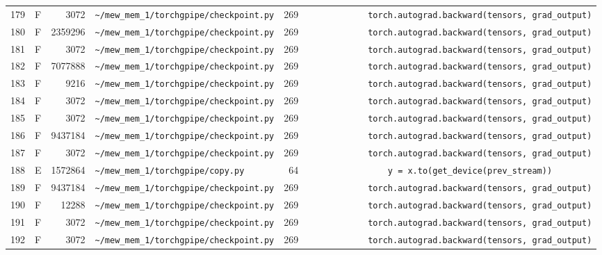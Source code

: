 \documentclass{article}
\begin{document}
\begin{longtable}{r l r p{6.5cm} r p{7.0cm}}
179 & F & 3072 & \lstinline|~/mew_mem_1/torchgpipe/checkpoint.py| & 269 & \lstinline|            torch.autograd.backward(tensors, grad_output)| \\
180 & F & 2359296 & \lstinline|~/mew_mem_1/torchgpipe/checkpoint.py| & 269 & \lstinline|            torch.autograd.backward(tensors, grad_output)| \\
181 & F & 3072 & \lstinline|~/mew_mem_1/torchgpipe/checkpoint.py| & 269 & \lstinline|            torch.autograd.backward(tensors, grad_output)| \\
182 & F & 7077888 & \lstinline|~/mew_mem_1/torchgpipe/checkpoint.py| & 269 & \lstinline|            torch.autograd.backward(tensors, grad_output)| \\
183 & F & 9216 & \lstinline|~/mew_mem_1/torchgpipe/checkpoint.py| & 269 & \lstinline|            torch.autograd.backward(tensors, grad_output)| \\
184 & F & 3072 & \lstinline|~/mew_mem_1/torchgpipe/checkpoint.py| & 269 & \lstinline|            torch.autograd.backward(tensors, grad_output)| \\
185 & F & 3072 & \lstinline|~/mew_mem_1/torchgpipe/checkpoint.py| & 269 & \lstinline|            torch.autograd.backward(tensors, grad_output)| \\
186 & F & 9437184 & \lstinline|~/mew_mem_1/torchgpipe/checkpoint.py| & 269 & \lstinline|            torch.autograd.backward(tensors, grad_output)| \\
187 & F & 3072 & \lstinline|~/mew_mem_1/torchgpipe/checkpoint.py| & 269 & \lstinline|            torch.autograd.backward(tensors, grad_output)| \\
188 & E & 1572864 & \lstinline|~/mew_mem_1/torchgpipe/copy.py| & 64 & \lstinline|                y = x.to(get_device(prev_stream))| \\
189 & F & 9437184 & \lstinline|~/mew_mem_1/torchgpipe/checkpoint.py| & 269 & \lstinline|            torch.autograd.backward(tensors, grad_output)| \\
190 & F & 12288 & \lstinline|~/mew_mem_1/torchgpipe/checkpoint.py| & 269 & \lstinline|            torch.autograd.backward(tensors, grad_output)| \\
191 & F & 3072 & \lstinline|~/mew_mem_1/torchgpipe/checkpoint.py| & 269 & \lstinline|            torch.autograd.backward(tensors, grad_output)| \\
192 & F & 3072 & \lstinline|~/mew_mem_1/torchgpipe/checkpoint.py| & 269 & \lstinline|            torch.autograd.backward(tensors, grad_output)| \\

\end{longtable}
\end{document}
